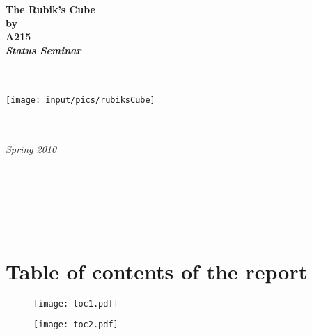 \documentclass{article}
\begin{document}
\thispagestyle{empty}
\begin{center}        %
  \vspace{5mm}          %
  \LARGE
  \textbf{The Rubik's Cube} \\
  \Large
  \vspace{5mm}
  \textbf{by} \\
  \vspace{5mm}
  \large
  \textbf{A215} \\
  \vspace{10mm}
  \Large
  {\bf{\textsl{Status Seminar}}} \\
   \vspace{2mm}
  {\bf{\textsl{}}} \\
  \vspace{5mm}
  {\large \textsl {}}\\
  
  
  \vspace{10mm}
  \centerline{\texttt{[image: input/pics/rubiksCube]}}
  \vspace{5mm}
  \textsl{} \\
  \textsl{} \\
  \vspace{10mm}
  \large
  \textsl{Spring 2010} \\
  \vspace{5mm}
  \normalsize
  \textsl{} \\
  \textsl{} \\
\end{center}

\ \pagebreak{}

\tableofcontents

\ \pagebreak{}
\section{Table of contents of the report}



\begin{figure}[hp]
	\centering
		\texttt{[image: toc1.pdf]}
		
		\label{fig:toc1}
\end{figure}
\begin{figure}
	\centering
		\texttt{[image: toc2.pdf]}
	
	\label{fig:toc2}
\end{figure}
\end{document}
